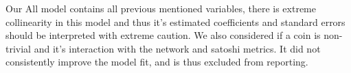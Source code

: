 Our All model contains all previous mentioned variables, there is extreme collinearity in this model and thus it's estimated coefficients and standard errors should be interpreted with extreme caution. 
We also considered if a coin is non-trivial and it's interaction with the network and satoshi metrics. It did not consistently improve the model fit, and is thus excluded from reporting. 











